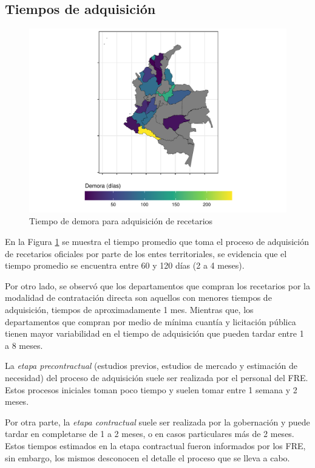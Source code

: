 \documentclass[
]{book}
\begin{document}
\hypertarget{tiempos-de-adquisiciuxf3n}{%
\subsection{Tiempos de adquisición}\label{tiempos-de-adquisiciuxf3n}}

\begin{figure}

{\centering \includegraphics[width=0.85\linewidth]{InformeFinal_files/figure-latex/tiempoDemoraAdquisicion-1} 

}

\caption{Tiempo de demora para adquisición de recetarios}\label{fig:tiempoDemoraAdquisicion}
\end{figure}

En la Figura \ref{fig:tiempoDemoraAdquisicion} se muestra el tiempo promedio que toma el proceso de adquisición de recetarios oficiales por parte de los entes territoriales, se evidencia que el tiempo promedio se encuentra entre 60 y 120 días (2 a 4 meses).

Por otro lado, se observó que los departamentos que compran los recetarios por la modalidad de contratación directa son aquellos con menores tiempos de adquisición, tiempos de aproximadamente 1 mes. Mientras que, los departamentos que compran por medio de mínima cuantía y licitación pública tienen mayor variabilidad en el tiempo de adquisición que pueden tardar entre 1 a 8 meses.

La \emph{etapa precontractual} (estudios previos, estudios de mercado y estimación de necesidad) del proceso de adquisición suele ser realizada por el personal del FRE. Estos procesos iniciales toman poco tiempo y suelen tomar entre 1 semana y 2 meses.

Por otra parte, la \emph{etapa contractual} suele ser realizada por la gobernación y puede tardar en completarse de 1 a 2 meses, o en casos particulares más de 2 meses. Estos tiempos estimados en la etapa contractual fueron informados por los FRE, sin embargo, los mismos desconocen el detalle el proceso que se lleva a cabo.
\end{document}
